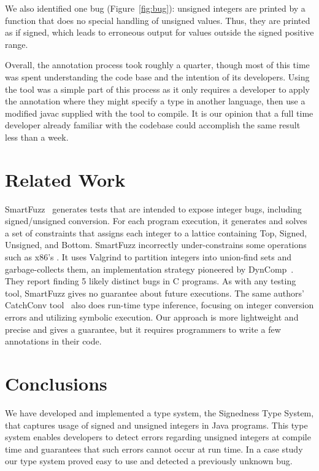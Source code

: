 \documentclass{sig-alternate-05-2015}
\def\<#1>{\codeid{#1}}
\begin{document}
We also identified one bug (Figure~\ref{fig:bug}):
unsigned integers are printed by a function that does no special handling
of unsigned values.  Thus, they are printed as
if signed, which leads to erroneous output for values outside the signed
positive range.

Overall, the annotation process took roughly a quarter, though most of this time
was spent understanding the code base and the intention of its developers. Using
the tool was a simple part of this process as it only requires a developer to
apply the \<@Unsigned> annotation where they might specify a type in another language,
then use a modified javac supplied with the tool to compile.
It is our opinion that a full time developer already familiar with the codebase
could accomplish the same result less than a week.


\section{Related Work}

SmartFuzz~\cite{MolnarLW2009} generates tests that are intended to expose
integer bugs, including signed/unsigned conversion.  For each program
execution, it generates and solves a set of constraints that assigns each
integer to a lattice containing Top, Signed, Unsigned, and Bottom.
SmartFuzz incorrectly under-constrains some operations such as x86's
\<IMUL>.  It uses Valgrind to partition integers into union-find sets and
garbage-collects them, an implementation strategy pioneered by
DynComp~\cite{GuoPME2006}.  They report finding 5 likely distinct bugs in C
programs.  As with any testing tool, SmartFuzz gives no guarantee about
future executions.  The same authors' CatchConv tool~\cite{MolnarW2007}
also does run-time type inference, focusing on integer conversion errors
and utilizing symbolic execution.  Our approach is more lightweight and
precise and gives a guarantee, but it requires programmers to write a few
annotations in their code.


\section{Conclusions}

We have developed and implemented a type system, the Signedness Type System, that
captures usage of signed and unsigned
integers in Java programs.
This type system enables developers to detect errors regarding unsigned
integers at compile time and guarantees that such errors cannot occur at
run time.
In a case study our type system proved easy to use and detected a
previously unknown bug.
\end{document}
